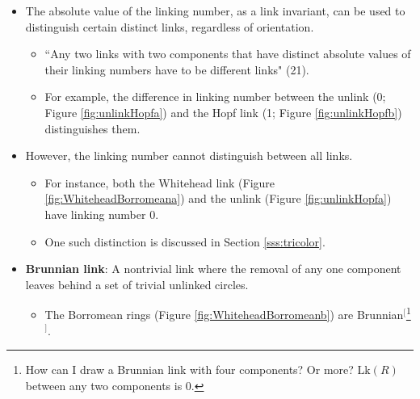 \documentclass[titlepage]{article}
\numberwithin{figure}{section}
\numberwithin{table}{section}
\numberwithin{equation}{section}
\newcommand{\dq}[2]{``#1" (#2).}
\begin{document}
\begin{itemize}
\begin{itemize}
    \end{itemize}
    \item The absolute value of the linking number, as a link invariant, can be used to distinguish certain distinct links, regardless of orientation.
    \begin{itemize}
        \item \dq{Any two links with two components that have distinct absolute values of their linking numbers have to be different links}{21}
        \item For example, the difference in linking number between the unlink (0; Figure \ref{fig:unlinkHopfa}) and the Hopf link (1; Figure \ref{fig:unlinkHopfb}) distinguishes them.
    \end{itemize}
    \item However, the linking number cannot distinguish between all links.
    \begin{itemize}
        \item For instance, both the Whitehead link (Figure \ref{fig:WhiteheadBorromeana}) and the unlink (Figure \ref{fig:unlinkHopfa}) have linking number 0.
        \item One such distinction is discussed in Section \ref{sss:tricolor}.
    \end{itemize}
    \item \textbf{Brunnian link}: A nontrivial link where the removal of any one component leaves behind a set of trivial unlinked circles.
    \begin{itemize}
        \item The Borromean rings (Figure \ref{fig:WhiteheadBorromeanb}) are Brunnian$^[$\footnote{How can I draw a Brunnian link with four components? Or more? $\text{Lk}(R)$ between any two components is 0.}$^]$.
    \end{itemize}
\end{itemize}
\end{document}
